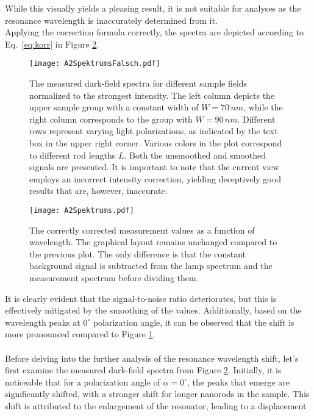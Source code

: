 While this visually yields a pleasing result, it is not suitable for analyses as 
the resonance wavelength is inaccurately determined from it. \\
Applying the correction formula correctly, the spectra are depicted according to 
Eq.~\eqref{eq:korr} in Figure \ref{fig:spektren2}.
\begin{figure}[h!]
    \centering
    \texttt{[image: A2SpektrumsFalsch.pdf]}
    \caption{\label{fig:spektren1}
    The measured dark-field spectra for different sample fields normalized to the strongest 
    intensity. 
    The left column depicts the upper sample group with a constant width of $W=70\,\si{nm}$, 
    while the right column corresponds to the group with $W=90\,\si{nm}$. Different rows 
    represent varying light polarizations, as indicated by the text box in the upper right corner. 
    Various colors in the plot correspond to different rod lengths $L$. Both the unsmoothed 
    and smoothed signals are presented. It is important to note that the current view employs 
    an incorrect intensity correction, yielding deceptively good results that are, however, inaccurate.}
\end{figure} \FloatBarrier
\begin{figure}[h!]
    \centering
    \texttt{[image: A2Spektrums.pdf]}
    \caption{\label{fig:spektren2}The correctly corrected measurement values as a function of wavelength. 
    The graphical layout remains unchanged compared to the previous plot. 
    The only difference is that the constant background signal is subtracted from the lamp 
    spectrum and the measurement spectrum before dividing them.}
\end{figure} \FloatBarrier
It is clearly evident that the signal-to-noise ratio deteriorates, 
but this is effectively mitigated by the smoothing of the values. 
Additionally, based on the wavelength peaks at $0^{\circ}$ polarization angle, 
it can be observed that the shift is more pronounced compared to Figure \ref{fig:spektren1}. \\ \\
Before delving into the further analysis of the resonance wavelength shift, 
let's first examine the measured dark-field spectra from Figure \ref{fig:spektren2}. 
Initially, it is noticeable that for a polarization angle of $\alpha=0^{\circ}$, 
the peaks that emerge are significantly shifted, with a stronger shift for longer nanorods in the sample. 
This shift is attributed to the enlargement of the resonator, leading to a displacement 
